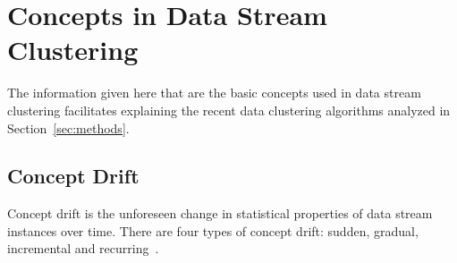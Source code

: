\documentclass[smallcondensed]{svjour3}     %
\begin{document}
%
\section{Concepts in Data Stream Clustering}
\label{sec:streamClustering}

The information given here that are the basic concepts used in data stream clustering facilitates explaining the recent data clustering algorithms analyzed in Section~\ref{sec:methods}.

\subsection{Concept Drift}
\label{subsub:conceptDrift}

Concept drift is the unforeseen change in statistical properties of data stream instances over time. There are four types of concept drift: sudden, gradual, incremental and recurring~\citep{RamirezDataPreprocessing}. 
\end{document}
